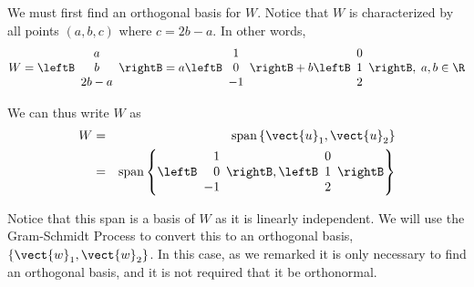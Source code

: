 \begin{solution}
We must first find an orthogonal basis for $W$. Notice that $W$ is
characterized by all points $(a,b,c)$ where $c = 2b-a$. In other
words,
\[
W = 
\leftB
\begin{array}{c}
a \\
b \\
2b - a 
\end{array}
\rightB
= 
a \leftB
\begin{array}{c}
1 \\
0 \\
-1 
\end{array}
\rightB
+ 
b \leftB
\begin{array}{c}
0 \\
1 \\
2 
\end{array}
\rightB, 
\; 
a,b \in \R
\] 

We can thus write $W$ as 
\begin{eqnarray*}
W &=& \mbox{span} \left\{ \vect{u}_1, \vect{u}_2 \right\} \\
 &=& \mbox{span} 
\left\{
\leftB
\begin{array}{r}
1 \\
0 \\
-1
\end{array}
\rightB,
\leftB
\begin{array}{c}
0 \\
1 \\
2
\end{array}
\rightB
\right\}
\end{eqnarray*}

Notice that this span is a basis of $W$ as it is linearly
independent. We will use the Gram-Schmidt Process to convert this to
an orthogonal basis, $\left\{\vect{w}_1, \vect{w}_2 \right\}$. In this
case, as we remarked it is only necessary to find an orthogonal basis, and it is not
required that it be orthonormal.


\end{solution}

